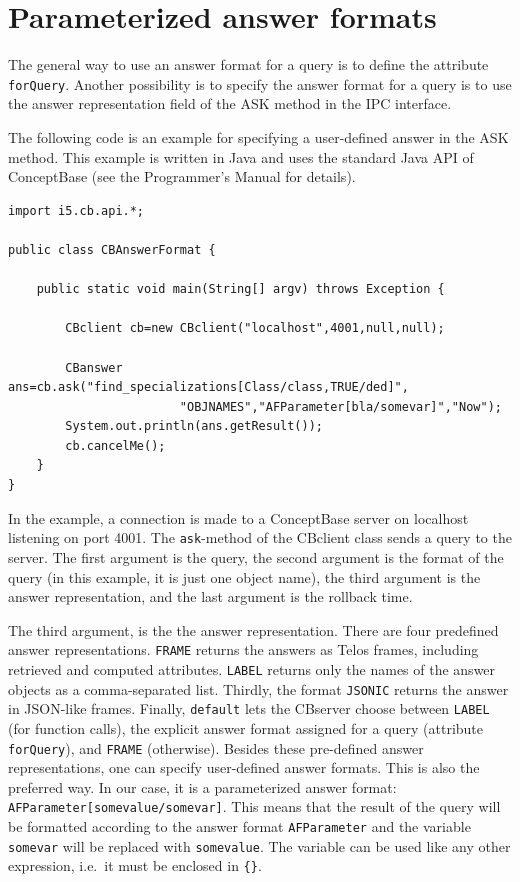 \section{Parameterized answer formats}

The general way to use an answer format for a query is to define the attribute {\tt forQuery}. Another possibility
is to specify the answer format for a query is to use the answer representation field of the ASK method in the IPC interface.

The following code is an example for specifying a user-defined answer in the ASK method.
This example is written in Java and uses the standard Java API of ConceptBase (see
the Programmer's Manual for details).

{\small
\begin{verbatim}
import i5.cb.api.*;

public class CBAnswerFormat {

    public static void main(String[] argv) throws Exception {

        CBclient cb=new CBclient("localhost",4001,null,null);

        CBanswer ans=cb.ask("find_specializations[Class/class,TRUE/ded]",
                        "OBJNAMES","AFParameter[bla/somevar]","Now");
        System.out.println(ans.getResult());
        cb.cancelMe();
    }
}
\end{verbatim}
}

In the example, a connection is made to a ConceptBase server on localhost listening on port 4001.
The {\tt ask}-method of the CBclient class sends a query to the server. The first argument
is the query, the second argument is the format of the query (in this example, it is just one object name),
the third argument is the answer representation, and the last argument is the rollback time.

The third argument, is the the answer representation.
There are four predefined answer representations. {\tt FRAME} returns the answers as
Telos frames, including retrieved and computed attributes. {\tt LABEL} returns only
the names of the answer objects as a comma-separated list. Thirdly, the format 
{\tt JSONIC} returns the answer in JSON-like frames.
Finally, {\tt default}
lets the CBserver choose between {\tt LABEL}  (for function calls), the explicit answer format assigned for
a query (attribute {\tt forQuery}),
and {\tt FRAME} (otherwise). Besides these pre-defined answer representations, one can specify
user-defined answer formats. This is also the preferred way.
In our case, it is a parameterized answer format: \verb+AFParameter[somevalue/somevar]+.
This means that the result of the query will be formatted according to
the answer format {\tt AFParameter} and the variable {\tt somevar}
will be replaced with {\tt somevalue}. The variable can be used like any other
expression, i.e.\ it must be enclosed in \verb+{}+.

